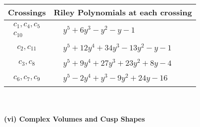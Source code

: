 \documentclass[1p]{elsarticle_modified}
\theoremstyle{definition}
\begin{document}
\begin{tabular}{m{50pt}|m{274pt}}
Crossings & \hspace{64pt}Riley Polynomials at each crossing \\
\hline $$\begin{aligned}c_{1},c_{4},c_{5}\\c_{10}\end{aligned}$$&$\begin{aligned}
&y^5+6 y^3- y^2- y-1
\end{aligned}$\\
\hline $$\begin{aligned}c_{2},c_{11}\end{aligned}$$&$\begin{aligned}
&y^5+12 y^4+34 y^3-13 y^2- y-1
\end{aligned}$\\
\hline $$\begin{aligned}c_{3},c_{8}\end{aligned}$$&$\begin{aligned}
&y^5+9 y^4+27 y^3+23 y^2+8 y-4
\end{aligned}$\\
\hline $$\begin{aligned}c_{6},c_{7},c_{9}\end{aligned}$$&$\begin{aligned}
&y^5-2 y^4+y^3-9 y^2+24 y-16
\end{aligned}$\\
\hline
\end{tabular}\\~\\
\newpage\flushleft \textbf{(vi) Complex Volumes and Cusp Shapes}
\end{document}
